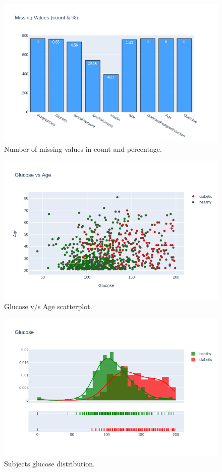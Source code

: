 \documentclass[12pt]{article}
\begin{document}
\begin{figure}[ht]
\centering
\includegraphics[width=1\textwidth]{4.png}
\caption{\label{fig:12} Number of missing values in count and percentage.}
\end{figure}

\begin{figure}[ht]
\centering
\includegraphics[width=1\textwidth]{5.png}
\caption{\label{fig:13} Glucose v/s Age scatterplot.}
\end{figure}


\begin{figure}[ht]
\centering
\includegraphics[width=1\textwidth]{7.png}
\caption{\label{fig:15} Subjects glucose distribution.}
\end{figure}
\end{document}
